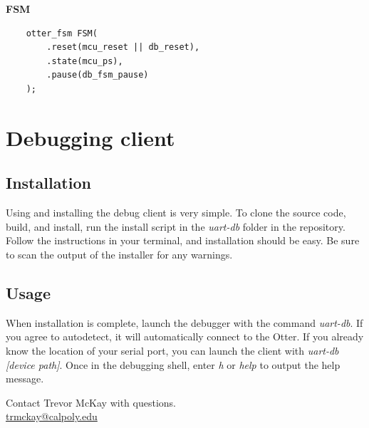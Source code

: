 \documentclass[10pt,a4paper]{article}
\begin{document}
\textbf{FSM}
\begin{verbatim}
    otter_fsm FSM(
        .reset(mcu_reset || db_reset),
        .state(mcu_ps),
        .pause(db_fsm_pause)
    );
\end{verbatim}

\section{Debugging client}
\subsection{Installation}
Using and installing the debug client is very simple. To clone the source code, build, and install,
run the install script in the \emph{uart-db} folder in the repository. Follow the instructions in
your terminal, and installation should be easy. Be sure to scan the output of the installer for
any warnings.

\subsection{Usage}
When installation is complete, launch the debugger with the command \emph{uart-db}. If you agree to
autodetect, it will automatically connect to the Otter. If you already know the location of your
serial port, you can launch the client with \emph{uart-db [device path]}. Once in the debugging shell,
enter \emph{h} or \emph{help} to output the help message.

\vspace*{\fill}
\begin{center}
    \noindent Contact Trevor McKay with questions.\\
    \href{mailto:trmckay@calpoly.edu}{trmckay@calpoly.edu}
\end{center}
\end{document}
